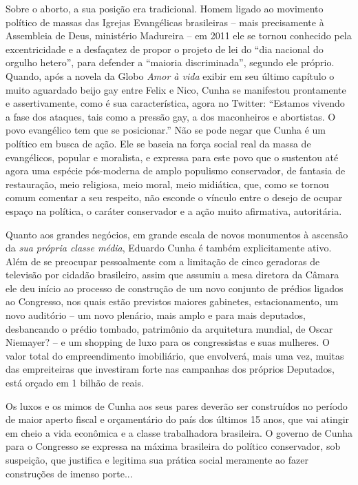 Sobre o aborto, a sua posição era tradicional. Homem ligado ao movimento
político de massas das Igrejas Evangélicas brasileiras -- mais
precisamente à Assembleia de Deus, ministério Madureira -- em 2011 ele
se tornou conhecido pela excentricidade e a desfaçatez de propor o
projeto de lei do ``dia nacional do orgulho hetero'', para defender a
``maioria discriminada'', segundo ele próprio. Quando, após a novela da
Globo \emph{Amor à vida} exibir em seu último capítulo o muito aguardado
beijo gay entre Felix e Nico, Cunha se manifestou prontamente e
assertivamente, como é sua característica, agora no Twitter: ``Estamos
vivendo a fase dos ataques, tais como a pressão gay, a dos maconheiros e
abortistas. O povo evangélico tem que se posicionar.'' Não se pode negar
que Cunha é um político em busca de ação. Ele se baseia na força social
real da massa de evangélicos, popular e moralista, e expressa para este
povo que o sustentou até agora uma espécie pós-moderna de amplo
populismo conservador, de fantasia de restauração, meio religiosa, meio
moral, meio midiática, que, como se tornou comum comentar a seu
respeito, não esconde o vínculo entre o desejo de ocupar espaço na
política, o caráter conservador e a ação muito afirmativa, autoritária.

Quanto aos grandes negócios, em grande escala de novos monumentos à
ascensão da \emph{sua própria classe média}, Eduardo Cunha é também
explicitamente ativo. Além de se preocupar pessoalmente com a limitação
de cinco geradoras de televisão por cidadão brasileiro, assim que
assumiu a mesa diretora da Câmara ele deu início ao processo de
construção de um novo conjunto de prédios ligados ao Congresso, nos
quais estão previstos maiores gabinetes, estacionamento, um novo
auditório -- um novo plenário, mais amplo e para mais deputados,
desbancando o prédio tombado, patrimônio da arquitetura mundial, de
Oscar Niemayer? -- e um shopping de luxo para os congressistas e suas
mulheres. O valor total do empreendimento imobiliário, que envolverá,
mais uma vez, muitas das empreiteiras que investiram forte nas campanhas
dos próprios Deputados, está orçado em 1 bilhão de reais.

Os luxos e os mimos de Cunha aos seus pares deverão ser construídos no
período de maior aperto fiscal e orçamentário do país dos últimos 15
anos, que vai atingir em cheio a vida econômica e a classe trabalhadora
brasileira. O governo de Cunha para o Congresso se expressa na máxima
brasileira do político conservador, sob suspeição, que justifica e
legitima sua prática social meramente ao fazer construções de imenso
porte...

